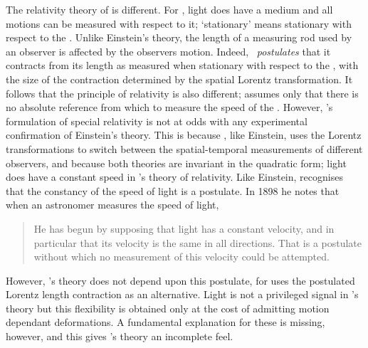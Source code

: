 The relativity theory of \Poincare is different.
For \Poincare, light does have a medium and all motions can be  measured with respect to it;
`stationary' means stationary with respect to the \aether\cite{Poincare1908,PoincareScienceAndMethod,Pierseaux2005}.
Unlike Einstein's theory, the length of a measuring rod used by an observer is affected by the observers motion.
Indeed, \Poincare\ {\em postulates} that it contracts from its  length as measured when stationary with respect to the \aether,
with the size of the contraction  determined by the spatial Lorentz transformation\cite{Poincare1906, Pierseaux2005}.
It follows that the principle of relativity  is also different;
\Poincare assumes only that there is no absolute reference from  which to measure the speed of the \aether\cite{Poincare1906}.
However, \Poincare's formulation of special relativity is not at odds with any experimental confirmation of Einstein's theory\cite{Pierseaux2001}.
This is because \Poincare, like Einstein, uses the Lorentz transformations to switch between the spatial-temporal measurements of different observers,
and because both theories are invariant in  the quadratic form;
light does have a constant speed in  \Poincare's theory of relativity\cite{Pierseaux2001}.
Like Einstein, \Poincare recognises that the constancy of the speed of light is a postulate.
In 1898\cite{Poincare1898} he notes that when an astronomer measures the speed of light, 
\blockquote{
  He has begun by supposing that light has a constant velocity, 
  and in particular that its velocity is the same in all directions. 
  That is a postulate without which no measurement of this velocity could be attempted. 
}
However, \Poincare's  theory does not depend upon this postulate,
for \Poincare uses the postulated Lorentz length contraction as an alternative\cite{Pierseaux2005}.
Light is not a privileged signal in \Poincare's theory
but this flexibility is obtained only at the cost of admitting  motion dependant deformations.
A fundamental explanation for these is  missing, however,
and this gives \Poincare's theory an incomplete feel.

